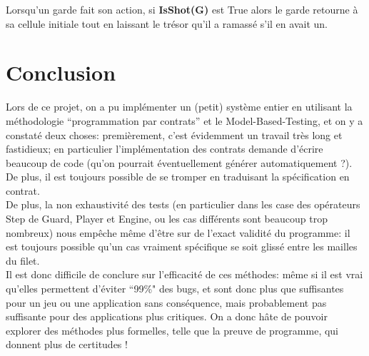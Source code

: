 \documentclass{article}
\begin{document}
Lorsqu'un garde fait son action, si \textbf{IsShot(G)} est True alors le garde retourne à sa cellule initiale tout en laissant le trésor qu'il a ramassé s'il en avait un.

\section{Conclusion}
Lors de ce projet, on a pu implémenter un (petit) système entier en utilisant la méthodologie ``programmation par contrats'' et le Model-Based-Testing, et on y a constaté deux choses: premièrement, c'est évidemment un travail très long et fastidieux; en particulier l'implémentation des contrats demande d'écrire beaucoup de code (qu'on pourrait éventuellement générer automatiquement ?). De plus, il est toujours possible de se tromper en traduisant la spécification en contrat.\\


De plus, la non exhaustivité des tests (en particulier dans les case des opérateurs \textrm{Step} de \textrm{Guard}, \textrm{Player} et \textrm{Engine}, ou les cas différents sont beaucoup trop nombreux) nous empêche même d'être sur de l'exact validité du programme: il est toujours possible qu'un cas vraiment spécifique se soit glissé entre les mailles du filet.\\

Il est donc difficile de conclure sur l'efficacité de ces méthodes: même si il est vrai qu'elles permettent d'éviter ``99\%" des bugs, et sont donc plus que suffisantes pour un jeu ou une application sans conséquence, mais probablement pas suffisante pour des applications plus critiques. On a donc hâte de pouvoir explorer des méthodes plus formelles, telle que la preuve de programme, qui donnent plus de certitudes !
\end{document}
